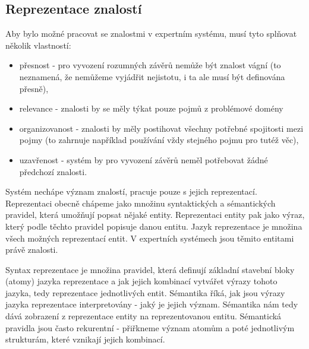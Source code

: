 \subsection{Reprezentace znalostí}
\label{knowledge representation}


Aby bylo možné pracovat se znalostmi v expertním systému, musí tyto splňovat
několik vlastností:
\begin{itemize}
  \item přesnost - pro vyvození rozumných závěrů nemůže být znalost vágní (to
    neznamená, že nemůžeme vyjádřit nejistotu, i ta ale musí být definována
    přesně),
  \item relevance - znalosti by se měly týkat pouze pojmů z problémové domény
  \item organizovanost - znalosti by měly postihovat všechny potřebné spojitosti
    mezi pojmy (to zahrnuje například používání vždy stejného pojmu pro tutéž
    věc),
  \item uzavřenost - systém by pro vyvození závěrů neměl potřebovat žádné
    předchozí znalosti.
\end{itemize}

Systém nechápe význam znalostí, pracuje pouze s jejich reprezentací.
Reprezentaci obecně chápeme jako množinu syntaktických a sémantických pravidel,
která umožňují popsat nějaké entity. Reprezentaci entity pak jako výraz, který
podle těchto pravidel popisuje danou entitu. Jazyk reprezentace je množina
všech možných reprezentací entit. V expertních systémech jsou těmito entitami
právě znalosti.

Syntax reprezentace je množina pravidel, která definují základní stavební bloky
(atomy) jazyka reprezentace a jak jejich kombinací vytvářet výrazy tohoto
jazyka, tedy reprezentace jednotlivých entit. Sémantika říká, jak jsou výrazy
jazyka reprezentace interpretovány - jaký je jejich význam. Sémantika nám tedy
dává zobrazení z reprezentace entity na reprezentovanou entitu. Sémantická
pravidla jsou často rekurentní - přiřkneme význam atomům a poté jednotlivým
strukturám, které vznikají jejich kombinací.

